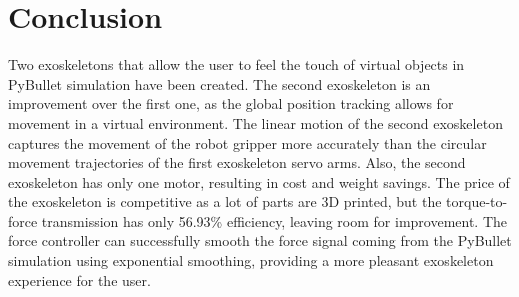 \section{Conclusion}
Two exoskeletons that allow the user to feel the touch of virtual objects in PyBullet simulation have been created. The second exoskeleton is an improvement over the first one, as the global position tracking allows for movement in a virtual environment. The linear motion of the second exoskeleton captures the movement of the robot gripper more accurately than the circular movement trajectories of the first exoskeleton servo arms. Also, the second exoskeleton has only one motor, resulting in cost and weight savings. The price of the exoskeleton is competitive as a lot of parts are 3D printed, but the torque-to-force transmission has only 56.93\% efficiency, leaving room for improvement. The force controller can successfully smooth the force signal coming from the PyBullet simulation using exponential smoothing, providing a more pleasant exoskeleton experience for the user.